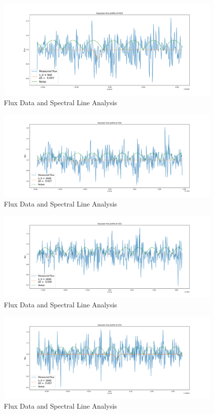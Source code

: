 \documentclass[reprint,english,notitlepage]{revtex4-2}
\begin{document}
\begin{figure}[h!]
  \centering
  \includegraphics[scale =.3]{Figures/H2O 940.pdf}
  \caption{Flux Data and Spectral Line Analysis}
  \label{fig: H2 940}
\end{figure}

\begin{figure}[h!]
  \centering
  \includegraphics[scale =.3]{Figures/CO2 1400.pdf}
  \caption{Flux Data and Spectral Line Analysis}
  \label{fig: CO2 1400}
\end{figure}

\begin{figure}[h!]
  \centering
  \includegraphics[scale =.3]{Figures/CO2 1600.pdf}
  \caption{Flux Data and Spectral Line Analysis}
  \label{fig: CO2 1600}
\end{figure}

\begin{figure}[h!]
  \centering
  \includegraphics[scale =.3]{Figures/CH4 1660.pdf}
  \caption{Flux Data and Spectral Line Analysis}
  \label{fig: CH4 1660}
\end{figure}
\end{document}
